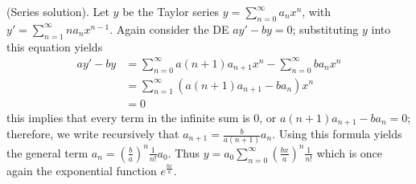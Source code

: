 \documentclass{article}
\begin{document}
\begin{method}
(Series solution). Let $y$ be the Taylor series $y = \sum_{n=0}^{\infty} a_n x^n$, with $y' = \sum_{n=1}^{\infty} n a_n x^{n-1}$. Again consider the DE $ay'-by=0$; substituting $y$ into this equation yields
\begin{equation*}
    \begin{aligned}
        ay' - by &= \sum_{n=0}^{\infty} a(n+1) a_{n+1} x^{n} - \sum_{n=0}^{\infty} ba_n x^n \\
        &= \sum_{n=1}^{\infty} (a(n+1)a_{n+1} - ba_n)x^n \\
        &= 0
    \end{aligned}
\end{equation*}
this implies that every term in the infinite sum is 0, or $a(n+1)a_{n+1} - ba_n = 0$; therefore, we write recursively that $a_{n+1} = \frac{b}{a(n+1)}a_n$. Using this formula yields the general term $a_n = (\frac{b}{a})^n\frac{1}{n!} a_0$. Thus $y = a_0 \sum_{n=0}^{\infty}(\frac{bx}{a})^n \frac{1}{n!}$ which is once again the exponential function $e^{\frac{bx}{a}}$.
\end{method}
\end{document}
